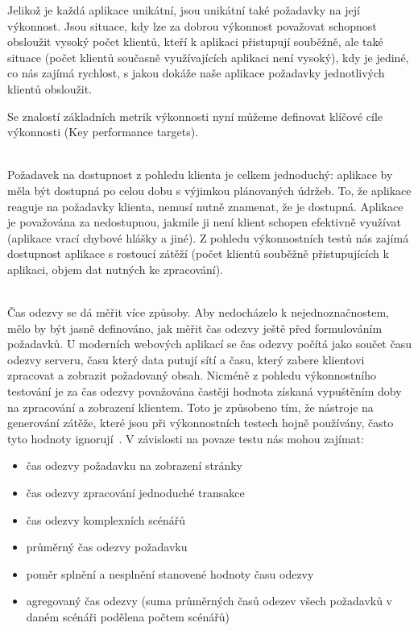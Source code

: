 \documentclass[122pt,oneside]{fithesis}
\begin{document}
Jelikož je každá aplikace unikátní, jsou unikátní také požadavky na její výkonnost. Jsou situace, kdy lze za dobrou výkonnost považovat schopnost obsloužit vysoký počet klientů, kteří k aplikaci přistupují souběžně, ale také situace (počet klientů současně využívajících aplikaci není vysoký), kdy je jediné, co nás zajímá rychlost, s jakou dokáže naše aplikace požadavky jednotlivých klientů obsloužit.
 
Se znalostí základních metrik výkonnosti nyní můžeme definovat klíčové cíle výkonnosti (Key performance targets).

\vspace{5 mm}
\\\indent Požadavek na dostupnost z pohledu klienta je celkem jednoduchý: aplikace by měla být dostupná po celou dobu s výjimkou plánovaných údržeb. To, že aplikace reaguje na požadavky klienta, nemusí nutně znamenat, že je dostupná. Aplikace je považována za nedostupnou, jakmile ji není klient schopen efektivně využívat (aplikace vrací chybové hlášky a jiné).
Z pohledu výkonnostních testů nás zajímá dostupnost aplikace s rostoucí zátěží (počet klientů souběžně přistupujících k aplikaci, objem dat nutných ke zpracování). 

\vspace{5 mm}
\\\indent Čas odezvy se dá měřit více způsoby. Aby nedocházelo k nejednoznačnostem, mělo by být jasně definováno, jak měřit čas odezvy ještě před formulováním požadavků. U moderních webových aplikací se čas odezvy počítá jako součet času odezvy serveru, času který data putují sítí a času, který zabere klientovi zpracovat a zobrazit požadovaný obsah. Nicméně z pohledu výkonnostního testování je za čas odezvy považována častěji hodnota získaná vypuštěním doby na zpracování a zobrazení klientem. Toto je způsobeno tím, že nástroje na generování zátěže, které jsou při výkonnostních testech hojně používány, často tyto hodnoty ignorují~\cite{moorthy09}.
V závislosti na povaze testu nás mohou zajímat:
\begin{itemize}
  \item čas odezvy požadavku na zobrazení stránky
  \item čas odezvy zpracování jednoduché transakce
  \item čas odezvy komplexních scénářů
  \item průměrný čas odezvy požadavku
  \item poměr splnění a nesplnění stanovené hodnoty času odezvy
  \item agregovaný čas odezvy (suma průměrných časů odezev všech požadavků v daném scénáři podělena počtem scénářů)
\end{itemize}
\end{document}
